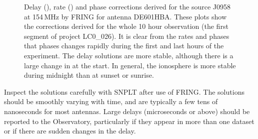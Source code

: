 \begin{figure}[htbp]
\centering
{}
\caption{
Delay (), rate () and phase
 corrections derived for the source J0958 at 154\,MHz
by FRING for antenna DE601HBA.  These plots show the corrections derived for
the whole 10 hour observation (the first segment of project LC0\_026). It is
clear from the rates and phases that phases changes rapidly during the first
and last hours of the experiment. The delay solutions are more stable, although
there is a large change in at the start. In general, the ionosphere is more
stable during midnight than at sunset or sunrise. 
}
\label{fig:fringsols}
\end{figure}
Inspect the solutions carefully with SNPLT after use of FRING. The
solutions should be smoothly varying with time, and are typically a
few tens of nanoseconds for most antennas. Large delays (microseconds
or above) should be reported to the Observatory, particularly if they
appear in more than one dataset or if there are sudden changes in
the delay.

